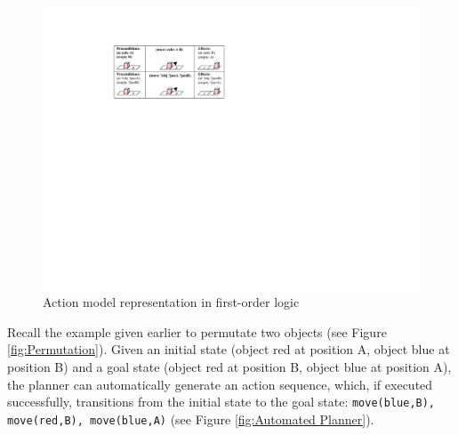 \begin{figure}[h]
	\centering
	\includegraphics[scale=0.4]{figures/schema-logic}
	\caption{Action model representation in first-order logic}
	\label{fig:Pick-up action model}
\end{figure}
Recall the example given earlier to permutate two objects (see Figure \ref{fig:Permutation}).
Given an initial state (object red at position A, object blue at position B) and a goal state (object red at position B, object blue at position A), the planner can automatically generate an action sequence, which, if executed successfully, transitions from the initial state to the goal state: \texttt{move(blue,B), move(red,B), move(blue,A)} (see Figure \ref{fig:Automated Planner}).

